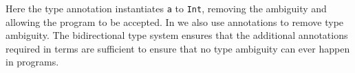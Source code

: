 \noindent Here the type annotation instantiates \verb|a| 
to \verb|Int|, removing the ambiguity and allowing the program to 
be accepted. In \name we also use annotations to remove type
ambiguity. The bidirectional type system ensures that the additional 
annotations required in terms are sufficient to ensure that no type
ambiguity can ever happen in \name programs.

\begin{comment}
\paragraph{Traits and Trait Calculi.}

The seminal paper by Schärli~\textit{et al.} introduced the ideas behind
traits. In their original paper, they documented an implementation of
the trait mechanism in a dynamically typed version of Smalltalk.
Fisher and Reppy~\cite{fisher2004typed} presented a statically typed
calculus that models traits. \name is not dedicated to traits; but rather, it
supports a source language that models traits. Compared to Fisher and Reppy's
calculus, \name is more lightweight. For example, self references (as
well as other OO-specific constructs) are
not built-in \name. One reason for the difference is that Fisher and Reppy's
calculus supports \emph{classes} in addition to traits, and considers the
interaction between them, whereas our object oriented source language is
\emph{prototype} (or delegation) based---the mechanism for code reuse is purely traits. Of
course, there have been many other formalizations of traits, such
as~\cite{scharli2003traitsformal}. But most of them are heavyweight and specific
to modeling traits and typical class-based models of OOP, and therefore differ from our approach.

Bettini~\textit{et al.}'s prototype language,
SWRTJ~\cite{bettini2010prototypical} distinguishes, in their terminology,
``records'' and ``traits''---the former contain fields and the latter contain
methods. Since we try to model a pure object-oriented language, we have excluded
fields, which provide state reuse. In SWRTJ, traits themselves are not meant to
be the generator of instances. Instead, another construct, called ``classes''
are, and make use of traits.

The Scala language also has a notion of ``traits''. However, unlike what its
name suggests,
the semantics of trait composition in Scala is more similar to
mixins~\cite{bracha1990mixin}. That is, like traditional mixin
semantics, when two traits are composed, Scala attempts to do
\emph{implicit resolution of conflicts}. In comparison, the traits modeled in
\name are
intended to model the original trait idea closely, and conflicts must
be resolved explicitly. Schärli~\textit{et al.} document well the trade-offs
between mixins and traits. Aside from that, Scala's
traits and our source language's traits have four major differences:


\end{comment}
